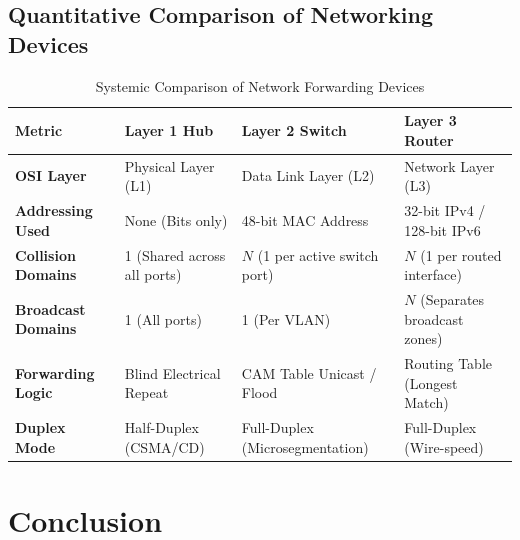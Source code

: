 \documentclass[12pt, a4paper]{article}
\begin{document}
\subsection{Quantitative Comparison of Networking Devices}
\begin{table}[H]
\centering
\caption{Systemic Comparison of Network Forwarding Devices}
\label{tab:device_comparison}
\begin{tabularx}{\textwidth}{lXXX}
\toprule
\textbf{Metric} & \textbf{Layer 1 Hub} & \textbf{Layer 2 Switch} & \textbf{Layer 3 Router} \\
\midrule
\textbf{OSI Layer} & Physical Layer (L1) & Data Link Layer (L2) & Network Layer (L3) \\
\textbf{Addressing Used} & None (Bits only) & 48-bit MAC Address & 32-bit IPv4 / 128-bit IPv6 \\
\textbf{Collision Domains} & 1 (Shared across all ports) & $N$ (1 per active switch port) & $N$ (1 per routed interface) \\
\textbf{Broadcast Domains}& 1 (All ports) & 1 (Per VLAN) & $N$ (Separates broadcast zones) \\
\textbf{Forwarding Logic} & Blind Electrical Repeat & CAM Table Unicast / Flood & Routing Table (Longest Match) \\
\textbf{Duplex Mode} & Half-Duplex (CSMA/CD) & Full-Duplex (Microsegmentation) & Full-Duplex (Wire-speed) \\
\bottomrule
\end{tabularx}
\end{table}

\section{Conclusion}
\end{document}
